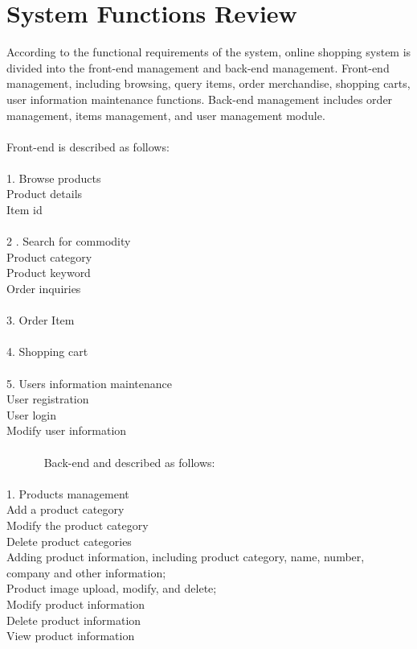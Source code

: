 \section{System Functions Review}
According to the functional requirements of the system, online shopping system is divided into the front-end management and back-end management. Front-end management, including browsing, query items, order merchandise, shopping carts, user information maintenance functions. Back-end management includes order management, items management, and user management module.\\
\\
Front-end is described as follows:\\
\\
1. Browse products\\
   Product details\\
   Item id\\
\\
 2 . Search for commodity\\
   Product category\\
   Product keyword\\
   Order inquiries\\
   \\
3. Order Item\\
\\
4. Shopping cart\\
\\
5. Users information maintenance\\
   User registration\\
   User login\\
   Modify user information\\
   \\
   ~      ~         ~               ~
Back-end and described as follows:\\
\\
1. Products management\\
  Add a product category\\
  Modify the product category\\
  Delete product categories\\
  Adding product information, including product category, name, number, company and other information;\\
  Product image upload, modify, and delete;\\
  Modify product information\\
  Delete product information\\
  View product information\\
